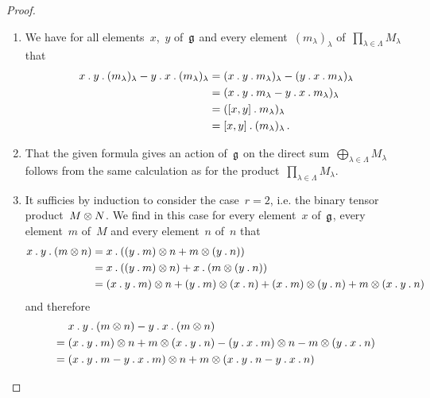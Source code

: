 \begin{proof}
  \leavevmode
  \begin{enumerate}
    \item
      We have for all elements~$x$,~$y$ of~$\mathfrak{g}$ and every element~$(m_\lambda)_\lambda$ of~$\prod_{\lambda \in \Lambda} M_\lambda$ that
      \begin{align*}
        x \mathbin{.} y \mathbin{.} (m_\lambda)_\lambda
        - y \mathbin{.} x \mathbin{.} (m_\lambda)_\lambda
        &=
        (x \mathbin{.} y \mathbin{.} m_\lambda)_\lambda
        - (y \mathbin{.} x \mathbin{.} m_\lambda)_\lambda
        \\
        &=
        (x \mathbin{.} y \mathbin{.} m_\lambda - y \mathbin{.} x \mathbin{.} m_\lambda)_\lambda
        \\
        &=
        ([x,y] \mathbin{.} m_\lambda)_\lambda
        \\
        &=
        [x,y] \mathbin{.} (m_\lambda)_\lambda \,.
      \end{align*}
    \item
      That the given formula gives an action of~$\mathfrak{g}$ on the direct sum~$\bigoplus_{\lambda \in \Lambda} M_\lambda$ follows from the same calculation as for the product~$\prod_{\lambda \in \Lambda} M_\lambda$.
    \item
      It sufficies by induction to consider the case~$r = 2$, i.e. the binary tensor product~$M \otimes N$.
      We find in this case for every element~$x$ of~$\mathfrak{g}$, every element~$m$ of~$M$ and every element~$n$ of~$n$ that
      \begin{align*}
        x \mathbin{.} y \mathbin{.} (m \otimes n)
        &=
        x \mathbin{.} ( (y \mathbin{.} m) \otimes n
        + m \otimes (y \mathbin{.} n) )
        \\
        &=
        x \mathbin{.} ( (y \mathbin{.} m) \otimes n)
        + x \mathbin{.} (m \otimes (y \mathbin{.} n) )
        \\
        &=
        (x \mathbin{.} y \mathbin{.} m) \otimes n
        + (y \mathbin{.} m) \otimes (x \mathbin{.} n)
        + (x \mathbin{.} m) \otimes (y \mathbin{.} n)
        + m \otimes (x \mathbin{.} y \mathbin{.} n)
      \end{align*}
      and therefore
      \begin{align*}
        {}&
        x \act y \act (m \tensor n)
        - y \act x \act (m \tensor n)
        \\
        ={}&
        (x \act y \act m) \tensor n
        + m \tensor (x \act y \act n)
        - (y \act x \act m) \tensor n
        - m \tensor (y \act x \act n)
        \\
        ={}&
        (x \act y \act m - y \act x \act m) \tensor n
        + m \tensor (x \act y \act n - y \act x \act n)

\end{align*}
\end{enumerate}
\end{proof}
